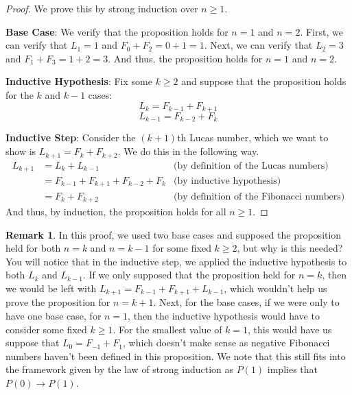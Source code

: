 \documentclass{article}
\theoremstyle{plain}
\theoremstyle{definition}
\newtheorem{remark}[theorem]{Remark}
\newcommand{\ra}{\rightarrow}
\begin{document}
\begin{proof}
    We prove this by strong induction over \(n \geq 1\).
    
    \textbf{Base Case}: We verify that the proposition holds for \(n=1\) and \(n=2\). First, we can verify that \(L_1 = 1\) and \(F_0 + F_2 = 0 + 1 = 1\). Next, we can verify that \(L_2 = 3\) and \(F_1 + F_3 = 1 + 2 = 3\). And thus, the proposition holds for \(n=1\) and \(n=2\).

    \textbf{Inductive Hypothesis}: Fix some \(k \geq 2\) and suppose that the proposition holds for the \(k\) and \(k-1\) cases:
    \[L_k = F_{k-1} + F_{k+1}\]
    \[L_{k-1} = F_{k-2} + F_{k}\]

    \textbf{Inductive Step}: Consider the \((k+1)\)th Lucas number, which we want to show is \(L_{k+1} = F_{k} + F_{k+2}\). We do this in the following way.
    \begin{align*}
        L_{k+1} &= L_{k} + L_{k-1} & \text{(by definition of the Lucas numbers)} \\
        &= F_{k-1} + F_{k+1} + F_{k-2} + F_{k} & \text{(by inductive hypothesis)} \\
        &= F_{k} + F_{k+2} & \text{(by definition of the Fibonacci numbers)}
    \end{align*}
    And thus, by induction, the proposition holds for all \(n \geq 1\).
\end{proof}

\begin{remark}
    In this proof, we used two base cases and supposed the proposition held for both \(n=k\) and \(n=k-1\) for some fixed \(k \geq 2\), but why is this needed? You will notice that in the inductive step, we applied the inductive hypothesis to both \(L_k\) and \(L_{k-1}\). If we only supposed that the proposition held for \(n=k\), then we would be left with \(L_{k+1} = F_{k-1} + F_{k+1} + L_{k-1}\), which wouldn't help us prove the proposition for \(n=k+1\). Next, for the base cases, if we were only to have one base case, for \(n=1\), then the inductive hypothesis would have to consider some fixed \(k \geq 1\). For the smallest value of \(k=1\), this would have us suppose that \(L_0 = F_{-1} + F_{1}\), which doesn't make sense as negative Fibonacci numbers haven't been defined in this proposition. We note that this still fits into the framework given by the law of strong induction as \(P(1)\) implies that \(P(0) \ra P(1)\). %
\end{remark}
\end{document}
